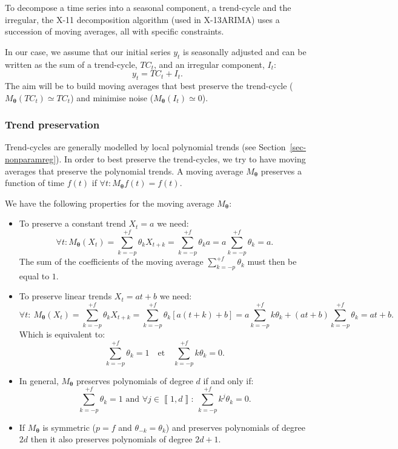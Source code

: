 \documentclass[
]{article}
\newcommand\1{\mathds{1}}
\begin{document}
To decompose a time series into a seasonal component, a trend-cycle and
the irregular, the X-11 decomposition algorithm (used in X-13ARIMA) uses
a succession of moving averages, all with specific constraints.

In our case, we assume that our initial series \(y_t\) is seasonally
adjusted and can be written as the sum of a trend-cycle, \(TC_t\), and
an irregular component, \(I_t\): \[
y_t=TC_t+I_t.
\] The aim will be to build moving averages that best preserve the
trend-cycle (\(M_{\boldsymbol\theta} (TC_t)\simeq TC_t\)) and minimise
noise (\(M_{\boldsymbol\theta} (I_t)\simeq 0\)).

\hypertarget{trend-preservation}{%
\subsubsection{Trend preservation}\label{trend-preservation}}

Trend-cycles are generally modelled by local polynomial trends (see
Section~\ref{sec-nonparamreg}). In order to best preserve the
trend-cycles, we try to have moving averages that preserve the
polynomial trends. A moving average \(M_{\boldsymbol\theta}\) preserves
a function of time \(f(t)\) if
\(\forall t:M_{\boldsymbol\theta} f(t)=f(t)\).

We have the following properties for the moving average
\(M_{\boldsymbol\theta}\):

\begin{itemize}
\item
  To preserve a constant trend \(X_t=a\) we need: \[
  \forall t:M_{\boldsymbol\theta}(X_t)=\sum_{k=-p}^{+f}\theta_kX_{t+k}=\sum_{k=-p}^{+f}\theta_ka=a\sum_{k=-p}^{+f}\theta_k=a.
  \] The sum of the coefficients of the moving average
  \(\sum_{k=-p}^{+f}\theta_k\) must then be equal to \(1\).
\item
  To preserve linear trends \(X_t=at+b\) we need: \[
  \forall t:\:M_{\boldsymbol\theta}(X_t)=\sum_{k=-p}^{+f}\theta_kX_{t+k}=\sum_{k=-p}^{+f}\theta_k[a(t+k)+b]=a\sum_{k=-p}^{+f}k\theta_k+(at+b)\sum_{k=-p}^{+f}\theta_k=at+b.
  \] Which is equivalent to: \[
  \sum_{k=-p}^{+f}\theta_k=1
  \quad\text{et}\quad
  \sum_{k=-p}^{+f}k\theta_k=0.
  \]
\item
  In general, \(M_{\boldsymbol\theta}\) preserves polynomials of degree
  \(d\) if and only if: \[
  \sum_{k=-p}^{+f}\theta_k=1
   \text{ and }
  \forall j \in \left\llbracket 1,d\right\rrbracket:\:
  \sum_{k=-p}^{+f}k^j\theta_k=0.
  \]
\item
  If \(M_{\boldsymbol\theta}\) is symmetric (\(p=f\) and
  \(\theta_{-k} = \theta_k\)) and preserves polynomials of degree \(2d\)
  then it also preserves polynomials of degree \(2d+1\).
\end{itemize}
\end{document}
